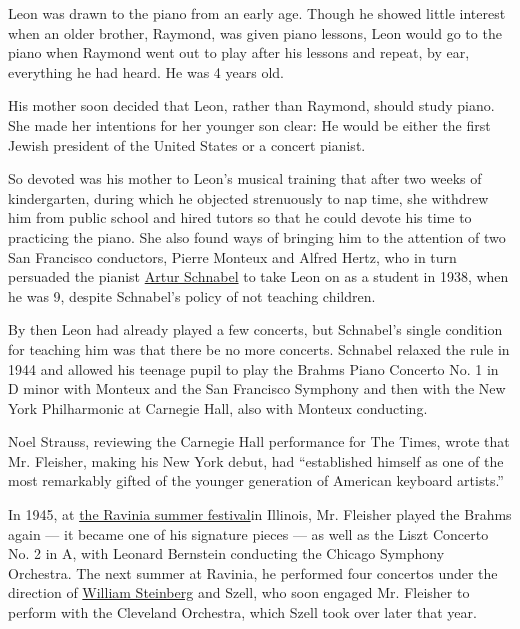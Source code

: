 Leon was drawn to the piano from an early age. Though he showed little
interest when an older brother, Raymond, was given piano lessons, Leon
would go to the piano when Raymond went out to play after his lessons
and repeat, by ear, everything he had heard. He was 4 years old.

His mother soon decided that Leon, rather than Raymond, should study
piano. She made her intentions for her younger son clear: He would be
either the first Jewish president of the United States or a concert
pianist.

So devoted was his mother to Leon's musical training that after two
weeks of kindergarten, during which he objected strenuously to nap time,
she withdrew him from public school and hired tutors so that he could
devote his time to practicing the piano. She also found ways of bringing
him to the attention of two San Francisco conductors, Pierre Monteux and
Alfred Hertz, who in turn persuaded the pianist
\href{https://www.nytimes.com/1951/08/16/archives/artur-schnabel-69-famed-pianist-dies-best-known-for-interpretation.html}{Artur
Schnabel} to take Leon on as a student in 1938, when he was 9, despite
Schnabel's policy of not teaching children.

By then Leon had already played a few concerts, but Schnabel's single
condition for teaching him was that there be no more concerts. Schnabel
relaxed the rule in 1944 and allowed his teenage pupil to play the
Brahms Piano Concerto No. 1 in D minor with Monteux and the San
Francisco Symphony and then with the New York Philharmonic at Carnegie
Hall, also with Monteux conducting.

Noel Strauss, reviewing the Carnegie Hall performance for The Times,
wrote that Mr. Fleisher, making his New York debut, had ``established
himself as one of the most remarkably gifted of the younger generation
of American keyboard artists.''

In 1945, at \href{https://www.ravinia.org/Page/History}{the Ravinia
summer festival}in Illinois, Mr. Fleisher played the Brahms again --- it
became one of his signature pieces --- as well as the Liszt Concerto No.
2 in A, with Leonard Bernstein conducting the Chicago Symphony
Orchestra. The next summer at Ravinia, he performed four concertos under
the direction of
\href{https://www.nytimes.com/1978/05/17/archives/william-steinberg-orchestral-conductor-dies-at-78-former-music.html}{William
Steinberg} and Szell, who soon engaged Mr. Fleisher to perform with the
Cleveland Orchestra, which Szell took over later that year.

